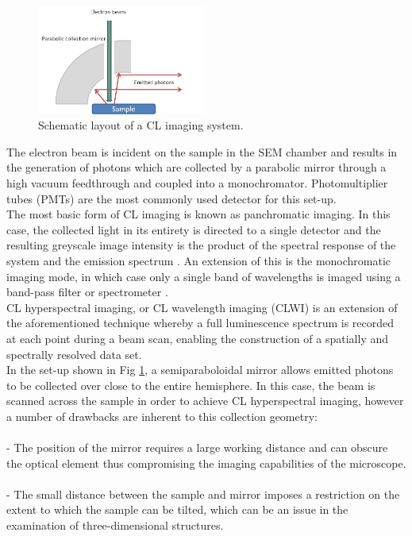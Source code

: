 \begin{figure}[!ht]
	\centering
	\includegraphics[width=0.5\textwidth]{Figs/Ch2/CL.png}
	\caption[h] {Schematic layout of a CL imaging system.}
	\label{2.6}
\end{figure}
\FloatBarrier

The electron beam is incident on the sample in the SEM chamber and results in the generation of photons which are collected by a parabolic mirror through a high vacuum feedthrough and coupled into a monochromator. Photomultiplier tubes (PMTs) are the most commonly used detector for this set-up. \\
The most basic form of CL imaging is known as panchromatic imaging. In this case, the collected light in its entirety is directed to a single detector and the resulting greyscale image intensity is the product of the spectral response of the system and the emission spectrum \cite{Edwards2011}. An extension of this is the monochromatic imaging mode, in which case only a single band of wavelengths is imaged using a band-pass filter or spectrometer \cite{Edwards2011}.\\
CL hyperspectral imaging, or CL wavelength imaging (CLWI) is an extension of the aforementioned technique whereby a full luminescence spectrum is recorded at each point during a beam scan, enabling the construction of a spatially and spectrally resolved data set.\\
 In the set-up shown in Fig \ref{2.6}, a semiparaboloidal mirror allows emitted photons to be collected over close to the entire hemisphere. In this case, the beam is scanned across the sample in order to achieve CL hyperspectral imaging, however a number of drawbacks are inherent to this collection geometry:\\
\\\indent - The position of the mirror requires a large working distance and can obscure the optical element thus compromising the imaging capabilities of the microscope.\\
\\\indent - The small distance between the sample and mirror imposes a restriction on the extent to which the sample can be tilted, which can be an issue in the examination of three-dimensional structures.\\
